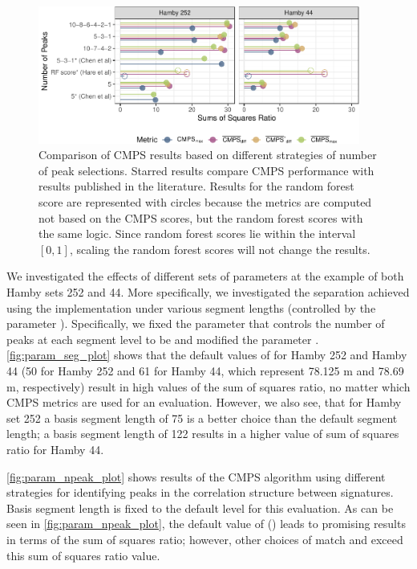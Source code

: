 \begin{Schunk}
\begin{figure}

{\centering \includegraphics[width=400px]{ju-hofmann_files/figure-latex/param_npeak_plot-1} 

}

\caption[Comparison of CMPS results based on different strategies of number of peak selections]{Comparison of CMPS results based on different strategies of number of peak selections. Starred results compare CMPS performance with results published in the literature. Results for the random forest score are represented with circles because the metrics are computed not based on the CMPS scores, but the random forest scores with the same logic. Since random forest scores lie within the interval $[0, 1]$, scaling the random forest scores will not change the results.}\label{fig:param_npeak_plot}
\end{figure}
\end{Schunk}

We investigated the effects of different sets of parameters at the
example of both Hamby sets 252 and 44. More specifically, we
investigated the separation achieved using the 
implementation under various segment lengths (controlled by the
parameter ). Specifically, we fixed the parameter
 that controls the number of peaks at each segment
level to be  and modified the parameter
. \autoref{fig:param_seg_plot} shows that the default
values of  for Hamby 252 and Hamby 44 (50 for Hamby
252 and 61 for Hamby 44, which represent 78.125 \textmu m and 78.69
\textmu m, respectively) result in high values of the sum of squares
ratio, no matter which CMPS metrics are used for an evaluation. However,
we also see, that for Hamby set 252 a basis segment length of 75 is a
better choice than the default segment length; a basis segment length of
122 results in a higher value of sum of squares ratio for Hamby 44.

\autoref{fig:param_npeak_plot} shows results of the CMPS algorithm using
different strategies for identifying peaks in the correlation structure
between signatures. Basis segment length is fixed to the default level
for this evaluation. As can be seen in \autoref{fig:param_npeak_plot},
the default value of  ()
leads to promising results in terms of the sum of squares ratio;
however, other choices of  match and exceed this sum of
squares ratio value.


